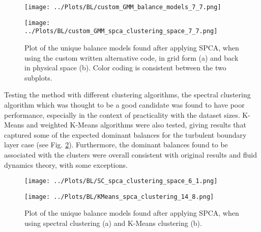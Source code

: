 \documentclass[12pt]{report} %
\begin{document}
\begin{figure}[htbp]
  \centering
  \begin{minipage}[b]{0.6\textwidth}
      \centering
      \texttt{[image: ../Plots/BL/custom\_GMM\_balance\_models\_7\_7.png]}
      \subcaption{}
  \end{minipage}

  \begin{minipage}[b]{0.6\textwidth}
      \centering
      \texttt{[image: ../Plots/BL/custom\_GMM\_spca\_clustering\_space\_7\_7.png]}
      \subcaption{}
  \end{minipage}

  \caption{Plot of the unique balance models found after applying SPCA, when using the custom written alternative code, in grid form (a) and back in physical space (b). Color coding is consistent between the two subplots.}
  \label{fig:custom_GMM_results}
\end{figure}

Testing the method with different clustering algorithms, the spectral clustering algorithm which was thought to be a good candidate \cite[Supplementary Information]{callaham2021learning} was found to have poor performance, especially in the context of practicality with the dataset sizes. K-Means and weighted K-Means algorithms were also tested, giving results that captured some of the expected dominant balances for the turbulent boundary layer case (see Fig. \ref{fig:other_algs}). Furthermore, the dominant balances found to be associated with the clusters were overall consistent with original results and fluid dynamics theory, with some exceptions.

\begin{figure}[htbp]
  \centering
  \begin{minipage}[b]{0.6\textwidth}
      \centering
      \texttt{[image: ../Plots/BL/SC\_spca\_clustering\_space\_6\_1.png]}
      \subcaption{}
  \end{minipage}

  \begin{minipage}[b]{0.6\textwidth}
      \centering
      \texttt{[image: ../Plots/BL/KMeans\_spca\_clustering\_14\_8.png]}
      \subcaption{}
  \end{minipage}

  \caption{Plot of the unique balance models found after applying SPCA, when using spectral clustering (a) and K-Means clustering (b).}
  \label{fig:other_algs}
\end{figure}
\end{document}
